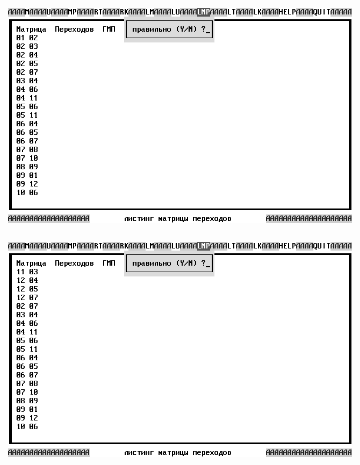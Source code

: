 \documentclass[a4paper,oneside,DIV=12,12pt]{scrartcl}
\begin{document}
		\begin{figure}
		\centering
			\begin{subfigure}[t]{0.5\linewidth-0.8em}
			\centering
				\includegraphics[width = \linewidth]{./assets/00-ris-rus_000-bw.png}
			\caption{}
			\label{subfig:ristpic-jump-matrix-00}
			\end{subfigure}
			\quad
			\begin{subfigure}[t]{0.5\linewidth-0.8em}
			\centering
				\includegraphics[width = \linewidth]{./assets/01-ris-rus_001-bw.png}
			\caption{}
			\label{subfig:ristpic-jump-matrix-01}
			\end{subfigure}\vspace*{\floatsep}
			

\end{figure}
\end{document}
